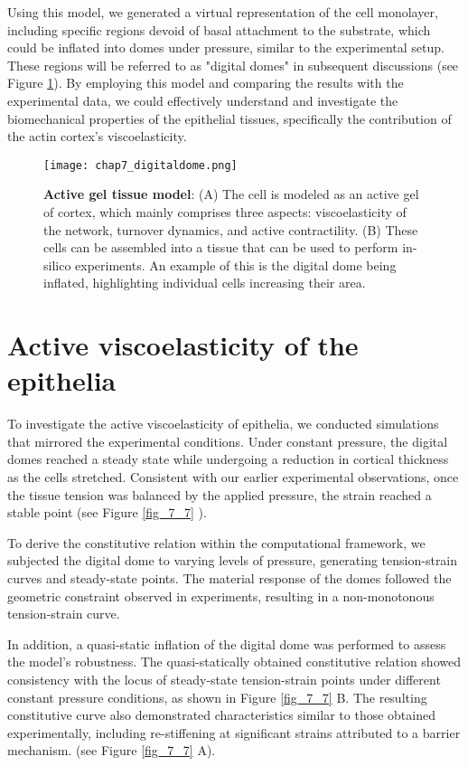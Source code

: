 Using this model, we generated a virtual representation of the cell monolayer, including specific regions devoid of basal attachment to the substrate, which could be inflated into domes under pressure, similar to the experimental setup. These regions will be referred to as "digital domes" in subsequent discussions (see Figure \ref{fig_7_2}). By employing this model and comparing the results with the experimental data, we could effectively understand and investigate the biomechanical properties of the epithelial tissues, specifically the contribution of the actin cortex's viscoelasticity.

\begin{figure}[]
	\centering
	\texttt{[image: chap7\_digitaldome.png]}
	\caption{\label{fig_7_2} \textbf{Active gel tissue model}: (A) The cell is modeled as an active gel of cortex, which mainly comprises three aspects: viscoelasticity of the network, turnover dynamics, and active contractility. (B) These cells can be assembled into a tissue that can be used to perform in-silico experiments. An example of this is the digital dome being inflated, highlighting individual cells increasing their area.}
\end{figure}

\hypertarget{active-viscoelasticity-of-the-epithelia}{%
	\section{Active viscoelasticity of the
		epithelia}\label{active-viscoelasticity-of-the-epithelia}}
	
	
	
To investigate the active viscoelasticity of epithelia, we conducted simulations that mirrored the experimental conditions. Under constant pressure, the digital domes reached a steady state while undergoing a reduction in cortical thickness as the cells stretched. Consistent with our earlier experimental observations, once the tissue tension was balanced by the applied pressure, the strain reached a stable point (see Figure  \ref{fig_7_7} ).

To derive the constitutive relation within the computational framework, we subjected the digital dome to varying levels of pressure, generating tension-strain curves and steady-state points. The material response of the domes followed the geometric constraint observed in experiments, resulting in a non-monotonous tension-strain curve.

In addition, a quasi-static inflation of the digital dome was performed to assess the model's robustness. The quasi-statically obtained constitutive relation showed consistency with the locus of steady-state tension-strain points under different constant pressure conditions, as shown in Figure \ref{fig_7_7} B. The resulting constitutive curve also demonstrated characteristics similar to those obtained experimentally, including re-stiffening at significant strains attributed to a barrier mechanism. (see Figure \ref{fig_7_7} A).

